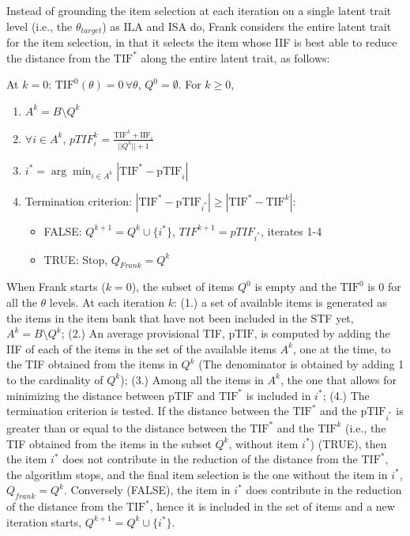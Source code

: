 \documentclass[12pt, a4paper, titilepage]{article}
\begin{document}
Instead of grounding the item selection at each iteration on a single latent trait level (i.e., the $\theta_{target}$) as ILA and ISA do, Frank considers the entire latent trait for the item selection, in that it selects the item whose IIF is best able to reduce the distance from the $\text{TIF}^*$ along the entire latent trait, as follows:

 
At $k = 0$: $\text{TIF}^0(\theta) = 0 \, \forall \theta$, $Q^0 = \emptyset$. For $k \geq 0$,

\begin{enumerate}
	\item  $A^k = B \setminus Q^k$ 
	\item $\forall i \in A^k$, $pTIF_{i}^k = \frac{\text{TIF}^k + \text{IIF}_{i}}{||Q^k||+1}$
	\item $i^* = \arg \min_{i \in A^k} |\text{TIF}^* - \text{pTIF}_i|$
	\item Termination criterion: $|\text{TIF}^* - \text{pTIF}_{i^*}| \geq |\text{TIF}^* - \text{TIF}^{k}|$: 
	\begin{itemize}
		\item FALSE:  $Q^{k+1} = Q^{k} \cup \{i^*\}$, $TIF^{k+1} = pTIF_{i^*}$, iterates 1-4 
\item TRUE: Stop, %
$Q_{Frank} = Q^k$
		
	\end{itemize}
\end{enumerate}

When Frank starts ($k = 0$), the subset of items $Q^0$ is empty and the $\text{TIF}^0$ is 0 for all the $\theta$ levels. 
At each iteration $k$: (1.) a set of available items is generated as the items in the item bank that have not been included in the STF yet, $A^k = B \setminus Q^k$; (2.)
An average provisional TIF, $\text{pTIF}$, is computed by adding the IIF of each of the items in the set of the available items $A^k$, one at the time, to the TIF obtained from the items in $Q^k$ (The denominator is obtained by adding 1 to the cardinality of $Q^k$); (3.) Among all the items in $A^k$, the one that allows for minimizing the distance between $\text{pTIF}$ and $\text{TIF}^*$ is included in $i^*$; (4.) 
The termination criterion is tested. 
If the distance between the $\text{TIF}^*$ and the $\text{pTIF}_{i^*}$ is greater than or equal to the distance between the $\text{TIF}^*$ and the $\text{TIF}^k$ (i.e., the TIF obtained from the items in the subset $Q^k$, without item $i^*$) (TRUE), then the item $i^*$ does not contribute in the reduction of the distance from the $\text{TIF}^*$, the algorithm stops, and the final item selection is the one without the item in $i^*$, $Q_{frank} = Q^k$. Conversely (FALSE), the item in $i^*$ does contribute in the reduction of the distance from the $\text{TIF}^*$, hence it is included in the set of items and a new iteration starts, $Q^{k+1} = Q^k \cup \{i^*\}$.
\end{document}
